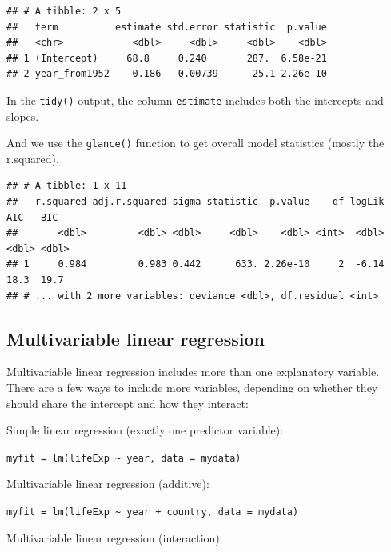 \documentclass[12pt,]{krantz}
\makeatletter
\newenvironment{Shaded}{\begin{snugshade}}{\end{snugshade}}
\newcommand{\KeywordTok}[1]{\textcolor[rgb]{0.13,0.29,0.53}{\textbf{#1}}}
\newcommand{\NormalTok}[1]{#1}
\newcommand{\OperatorTok}[1]{\textcolor[rgb]{0.81,0.36,0.00}{\textbf{#1}}}
\newcommand{\StringTok}[1]{\textcolor[rgb]{0.31,0.60,0.02}{#1}}
\newenvironment{kframe}{%
\medskip{}
\setlength{\fboxsep}{.8em}
 \def\at@end@of@kframe{}%
 \ifinner\ifhmode%
  \def\at@end@of@kframe{\end{minipage}}%
  \begin{minipage}{\columnwidth}%
 \fi\fi%
 \def\FrameCommand##1{\hskip\@totalleftmargin \hskip-\fboxsep
 \colorbox{shadecolor}{##1}\hskip-\fboxsep
     \hskip-\linewidth \hskip-\@totalleftmargin \hskip\columnwidth}%
 \MakeFramed {\advance\hsize-\width
   \@totalleftmargin\z@ \linewidth\hsize
   \@setminipage}}%
 {\par\unskip\endMakeFramed%
 \at@end@of@kframe}
\renewenvironment{Shaded}{\begin{kframe}}{\end{kframe}}
\theoremstyle{definition}
\theoremstyle{definition}
\theoremstyle{definition}
\theoremstyle{remark}
\makeatother
\begin{document}
\begin{verbatim}
## # A tibble: 2 x 5
##   term          estimate std.error statistic  p.value
##   <chr>            <dbl>     <dbl>     <dbl>    <dbl>
## 1 (Intercept)     68.8     0.240       287.  6.58e-21
## 2 year_from1952    0.186   0.00739      25.1 2.26e-10
\end{verbatim}

In the \texttt{tidy()} output, the column \texttt{estimate} includes
both the intercepts and slopes.

And we use the \texttt{glance()} function to get overall model
statistics (mostly the r.squared).

\begin{Shaded}
\end{Shaded}

\begin{verbatim}
## # A tibble: 1 x 11
##   r.squared adj.r.squared sigma statistic  p.value    df logLik   AIC   BIC
##       <dbl>         <dbl> <dbl>     <dbl>    <dbl> <int>  <dbl> <dbl> <dbl>
## 1     0.984         0.983 0.442      633. 2.26e-10     2  -6.14  18.3  19.7
## # ... with 2 more variables: deviance <dbl>, df.residual <int>
\end{verbatim}

\hypertarget{multivariable-linear-regression}{%
\subsection{Multivariable linear
regression}\label{multivariable-linear-regression}}

Multivariable linear regression includes more than one explanatory
variable. There are a few ways to include more variables, depending on
whether they should share the intercept and how they interact:

Simple linear regression (exactly one predictor variable):

\texttt{myfit\ =\ lm(lifeExp\ \textasciitilde{}\ year,\ data\ =\ mydata)}

Multivariable linear regression (additive):

\texttt{myfit\ =\ lm(lifeExp\ \textasciitilde{}\ year\ +\ country,\ data\ =\ mydata)}

Multivariable linear regression (interaction):
\end{document}
